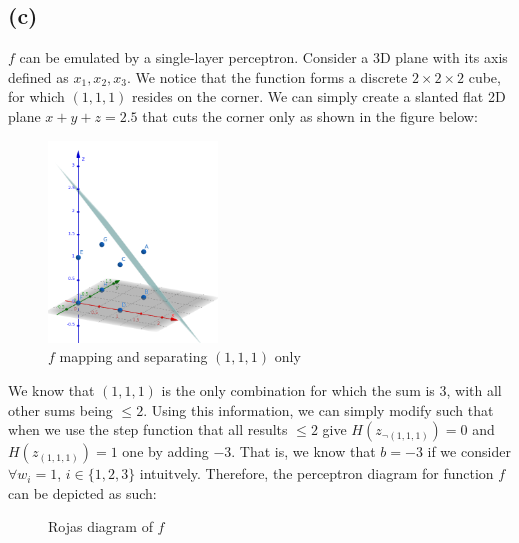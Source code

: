 \documentclass[a4paper]{article}
\theoremstyle{plain}
\theoremstyle{definition}
\theoremstyle{remark}
\begin{document}
\subsection{(c)}
$f$ can be emulated by a single-layer perceptron. Consider a 3D plane with its axis defined as $x_1,x_2,x_3$. We notice that the function forms a discrete $2 \times 2 \times 2$ cube, for which $(1,1,1)$ resides on the corner. We can simply create a slanted flat 2D plane $x+y+z=2.5$ that cuts the corner only as shown in the figure below:
\begin{figure}[H]
	\centering
	\includegraphics[width=0.4\textwidth]{cube.png}
	\caption{$f$ mapping and separating $(1,1,1)$ only}
	\label{fig:cube-png}
\end{figure}
\noindent We know that $(1,1,1)$ is the only combination for which the sum is $3$, with all other sums being $\le  2$. Using this information, we can simply modify such that when we use the step function that all results $\le 2$ give $H(z_{\neg(1,1,1)}) = 0$ and $H(z_{(1,1,1)})=1$ one by adding $-3$. That is, we know that $b=-3$ if we consider $\forall w_i = 1$, $i \in \{1,2,3\}$ intuitvely. Therefore, the perceptron diagram for function $f$ can be depicted as such:
\begin{figure}[H]
	\centering
	\caption{Rojas diagram of $f$}
	\label{fig:rojas}
\end{figure}
\newpage
\end{document}

